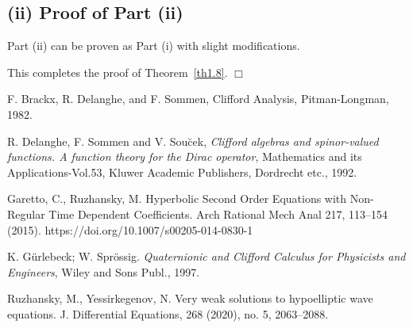 \documentclass[12pt]{amsart}
\theoremstyle{definition}
\begin{document}
\subsection*{(ii) Proof of Part (ii)}

Part (ii) can be proven as Part (i) with slight modifications.

This completes the proof of Theorem~\ref{th1.8}. $\Box$


\begin{thebibliography}{2025}

 F. Brackx, R. Delanghe, and F. Sommen, Clifford Analysis, Pitman-Longman, 1982.

R. Delanghe, F. Sommen and V. Sou\u{c}ek, \textit{Clifford algebras and spinor-valued functions. A function theory for the Dirac operator}, Mathematics and its Applications-Vol.53, Kluwer Academic Publishers,
Dordrecht etc., 1992.


Garetto, C., Ruzhansky, M. Hyperbolic Second Order Equations with Non-Regular Time Dependent Coefficients. Arch Rational Mech Anal 217, 113–154 (2015). https://doi.org/10.1007/s00205-014-0830-1

 K. G\"urlebeck; W. Spr\"ossig. \textit{Quaternionic and Clifford Calculus for Physicists and Engineers}, Wiley and Sons Publ., 1997.	


Ruzhansky, M.,  Yessirkegenov, N.  Very weak solutions to hypoelliptic wave equations. J. Differential Equations, 268 (2020), no. 5, 2063–2088.
\end{thebibliography}
\end{document}
